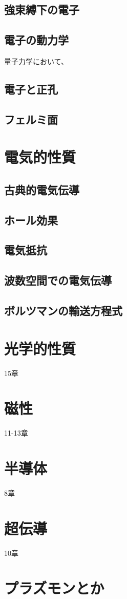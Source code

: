 \documentclass[a4paper]{jsreport}
\begin{document}
        \section{強束縛下の電子}

        \section{電子の動力学}
            量子力学において、

        \section{電子と正孔}

        \section{フェルミ面}

    \chapter{電気的性質}
        \section{古典的電気伝導}
        \section{ホール効果}
        \section{電気抵抗}
        \section{波数空間での電気伝導}
        \section{ボルツマンの輸送方程式}

    \chapter{光学的性質}
        15章
    \chapter{磁性}
        11-13章
    \chapter{半導体}
        8章
    \chapter{超伝導}
        10章
    \chapter{プラズモンとか}
            
\end{document}
